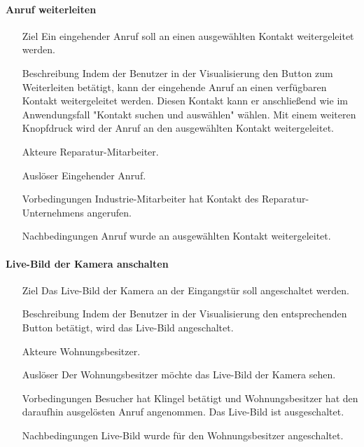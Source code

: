 \paragraph{Anruf weiterleiten}
    \begin{itemize}
        \item[Ziel]
        Ein eingehender Anruf soll an einen ausgewählten Kontakt weitergeleitet werden.
        \item[Beschreibung]
        Indem der Benutzer in der Visualisierung den Button zum Weiterleiten betätigt, kann der eingehende Anruf an einen verfügbaren Kontakt weitergeleitet werden.
        Diesen Kontakt kann er anschließend wie im Anwendungsfall "Kontakt suchen und auswählen" wählen.
        Mit einem weiteren Knopfdruck wird der Anruf an den ausgewählten Kontakt weitergeleitet.
        \item[Akteure]
        Reparatur-Mitarbeiter.
        \item[Auslöser]
        Eingehender Anruf.
        \item[Vorbedingungen]
        Industrie-Mitarbeiter hat Kontakt des Reparatur-Unternehmens angerufen.
        \item[Nachbedingungen]
        Anruf wurde an ausgewählten Kontakt weitergeleitet.
        \end{itemize}

\paragraph{Live-Bild der Kamera anschalten}
    \begin{itemize}
        \item[Ziel]
        Das Live-Bild der Kamera an der Eingangstür soll angeschaltet werden.
        \item[Beschreibung]
        Indem der Benutzer in der Visualisierung den entsprechenden Button betätigt, wird das Live-Bild angeschaltet.
        \item[Akteure]
        Wohnungsbesitzer.
        \item[Auslöser]
        Der Wohnungsbesitzer möchte das Live-Bild der Kamera sehen.
        \item[Vorbedingungen]
        Besucher hat Klingel betätigt und Wohnungsbesitzer hat den daraufhin ausgelösten Anruf angenommen.
        Das Live-Bild ist ausgeschaltet.
        \item[Nachbedingungen]
        Live-Bild wurde für den Wohnungsbesitzer angeschaltet.
        \end{itemize}

